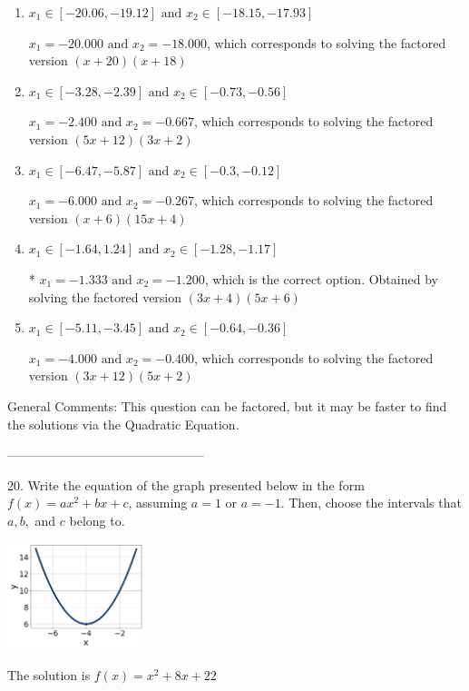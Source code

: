 \documentclass{extbook}[14pt]
\begin{document}
\begin{enumerate}[label=\Alph*.] 
\item $ x_1 \in [-20.06, -19.12] \text{ and } x_2 \in [-18.15, -17.93] $ 

 $x_1 = -20.000 \text{ and } x_2 = -18.000$, which corresponds to solving the factored version $(x + 20)(x + 18)$ 
\item $ x_1 \in [-3.28, -2.39] \text{ and } x_2 \in [-0.73, -0.56] $ 

 $x_1 = -2.400 \text{ and } x_2 = -0.667$, which corresponds to solving the factored version $(5x + 12)(3x + 2)$ 
\item $ x_1 \in [-6.47, -5.87] \text{ and } x_2 \in [-0.3, -0.12] $ 

 $x_1 = -6.000 \text{ and } x_2 = -0.267$, which corresponds to solving the factored version $(x + 6)(15x + 4)$ 
\item $ x_1 \in [-1.64, 1.24] \text{ and } x_2 \in [-1.28, -1.17] $ 

 * $x_1 = -1.333 \text{ and } x_2 = -1.200$, which is the correct option. Obtained by solving the factored version $(3x + 4)(5x + 6)$ 
\item $ x_1 \in [-5.11, -3.45] \text{ and } x_2 \in [-0.64, -0.36] $ 

 $x_1 = -4.000 \text{ and } x_2 = -0.400$, which corresponds to solving the factored version $(3x + 12)(5x + 2)$ 
\end{enumerate} 
 
General Comments: This question can be factored, but it may be faster to find the solutions via the Quadratic Equation.

-----------------------------------------------

20. Write the equation of the graph presented below in the form $f(x)=ax^2+bx+c$, assuming  $a=1$ or $a=-1$. Then, choose the intervals that $a, b,$ and $c$ belong to.
\begin{center} \includegraphics[width=0.3\textwidth]{../Figures/quadraticGraphToEquationC.png} \end{center} 

The solution is $ f(x) = x^{2} +8 x + 22 $ 
\end{document}
